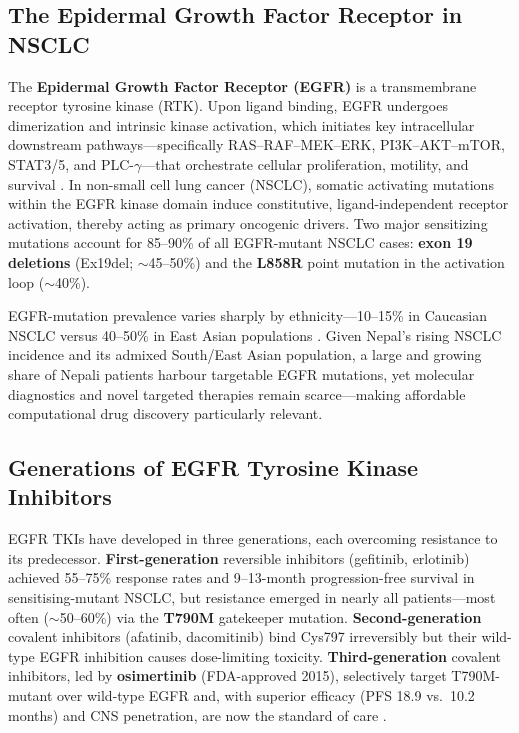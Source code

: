 \subsection{The Epidermal Growth Factor Receptor in NSCLC}

The \textbf{Epidermal Growth Factor Receptor (EGFR)} is a transmembrane receptor tyrosine kinase (RTK). Upon ligand binding, EGFR undergoes dimerization and intrinsic kinase activation, which initiates key intracellular downstream pathways—specifically \mbox{RAS–RAF–MEK–ERK}, \mbox{PI3K–AKT–mTOR}, STAT3/5, and \mbox{PLC-$\gamma$}—that orchestrate cellular proliferation, motility, and survival \parencite{rotow2023egfr}. In non-small cell lung cancer (NSCLC), somatic activating mutations within the EGFR kinase domain induce constitutive, ligand-independent receptor activation, thereby acting as primary oncogenic drivers. Two major sensitizing mutations account for 85–90\% of all EGFR-mutant NSCLC cases: \textbf{exon 19 deletions} (Ex19del; $\sim$45–50\%) and the \textbf{L858R} point mutation in the activation loop ($\sim$40\%).

EGFR-mutation prevalence varies sharply by ethnicity---10--15\% in Caucasian NSCLC
versus 40--50\% in East Asian populations \parencite{leonetti2019resistance}. Given
Nepal's rising NSCLC incidence and its admixed South/East Asian population, a large
and growing share of Nepali patients harbour targetable EGFR mutations, yet molecular
diagnostics and novel targeted therapies remain scarce---making affordable
computational drug discovery particularly relevant.

\subsection{Generations of EGFR Tyrosine Kinase Inhibitors}

EGFR TKIs have developed in three generations, each overcoming resistance to its
predecessor. \textbf{First-generation} reversible inhibitors (gefitinib, erlotinib)
achieved 55--75\% response rates and 9--13-month progression-free survival in
sensitising-mutant NSCLC, but resistance emerged in nearly all patients---most often
($\sim$50--60\%) via the \textbf{T790M} gatekeeper mutation.
\textbf{Second-generation} covalent inhibitors (afatinib, dacomitinib) bind Cys797
irreversibly but their wild-type EGFR inhibition causes dose-limiting toxicity.
\textbf{Third-generation} covalent inhibitors, led by \textbf{osimertinib}
(FDA-approved 2015), selectively target T790M-mutant over wild-type EGFR and, with
superior efficacy (PFS 18.9 vs.\ 10.2 months) and CNS penetration, are now the
standard of care \parencite{rotow2023egfr}.

